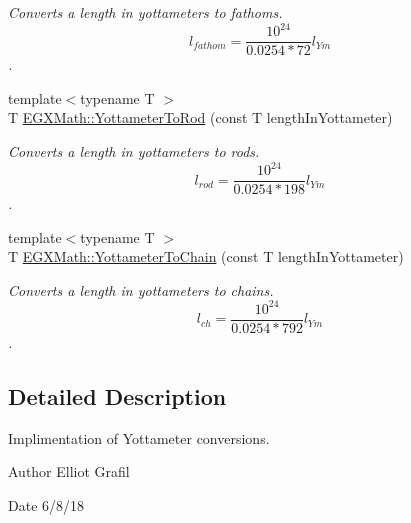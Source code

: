 \begin{DoxyCompactItemize}
\begin{DoxyCompactList}\small\item\em Converts a length in yottameters to fathoms. \[ l_{fathom}= \frac{10^{24}}{0.0254 * 72} l_{Ym} \]. \end{DoxyCompactList}\item 
{\footnotesize template$<$typename T $>$ }\\T \mbox{\hyperlink{group___e_g_x_math-_conversions-_length_conversions-_s_i-_yottameter-_surveyors_ga877c3000c23a08dc1bcd3c4359482356}{E\+G\+X\+Math\+::\+Yottameter\+To\+Rod}} (const T length\+In\+Yottameter)
\begin{DoxyCompactList}\small\item\em Converts a length in yottameters to rods. \[ l_{rod}= \frac{10^{24}}{0.0254 * 198} l_{Ym} \]. \end{DoxyCompactList}\item 
{\footnotesize template$<$typename T $>$ }\\T \mbox{\hyperlink{group___e_g_x_math-_conversions-_length_conversions-_s_i-_yottameter-_surveyors_gaac21de73406e1f0b39f48edd2bed4e4f}{E\+G\+X\+Math\+::\+Yottameter\+To\+Chain}} (const T length\+In\+Yottameter)
\begin{DoxyCompactList}\small\item\em Converts a length in yottameters to chains. \[ l_{ch}= \frac{10^{24}}{0.0254 * 792} l_{Ym} \]. \end{DoxyCompactList}\end{DoxyCompactItemize}


\subsection{Detailed Description}
Implimentation of Yottameter conversions. 

\begin{DoxyAuthor}{Author}
Elliot Grafil 
\end{DoxyAuthor}
\begin{DoxyDate}{Date}
6/8/18 
\end{DoxyDate}

